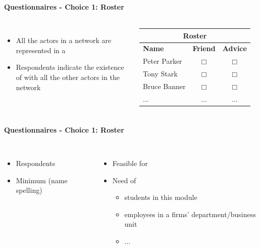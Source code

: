 \documentclass[8pt]{beamer}
\begin{document}
\begin{frame}
\frametitle{\insertsection}
\framesubtitle{Questionnaires - Choice 1: Roster}

\begin{columns}[c]

\begin{itemize}
\item All the actors in a network are represented in a {\color{blue}{roster}}
\item Respondents indicate the existence of {\color{blue}{ ties}} with all the other actors in the network
\end{itemize} 


\footnotesize
\centering
\begin{tabular}{lcc}
\multicolumn{3}{c}{\textbf{Roster}} \\
\toprule
\textbf{Name} & \textbf{Friend} & \textbf{Advice}\\
\hline
Peter Parker      &$\Box$    &$\Box$  \\
Tony Stark        &$\Box$    &$\Box$  \\
Bruce Banner      &$\Box$    &$\Box$  \\
...               &...       &...     \\
\bottomrule
\end{tabular}

\end{columns}


\end{frame}


\begin{frame}
\frametitle{\insertsection}
\framesubtitle{Questionnaires - Choice 1: Roster}

\begin{columns}[t]

{\color{dkgreen}{Advantages}}
\begin{itemize}
\item Respondents {\color{dkgreen}{recognise names}}
\item Minimum {\color{dkgreen}{data cleaning}} (name spelling)
\end{itemize} 

{\color{red}{Limitations}}
\begin{itemize}
\item Feasible for {\color{red}{small networks}}
\item Need of {\color{red}{well-delineated boundaries}}
    \begin{itemize}
    \item students in this module
    \item employees in a firms' department/business unit
    \item ...
    \end{itemize} 
\end{itemize} 

\end{columns}

\end{frame}
\end{document}
